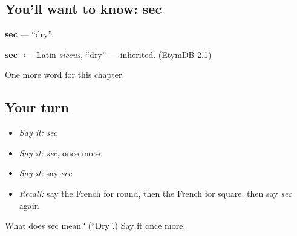 \subsection*{You'll want to know: sec}
\textbf{sec} — \textquotedblleft{}dry\textquotedblright{}.

\begin{cousinweb}
\textbf{sec} $\leftarrow$ Latin \emph{siccus}, \textquotedblleft{}dry\textquotedblright{} — inherited. (EtymDB 2.1)
\end{cousinweb}

\begin{grammarlens}[title={What you've built}]
One more word for this chapter.
\end{grammarlens}

\subsection*{Your turn}
\begin{itemize}
\raggedright
  \item \emph{Say it:} \emph{sec}
  \item \emph{Say it:} \emph{sec}, once more
  \item \emph{Say it:} say \emph{sec}
  \item \emph{Recall:} say the French for round, then the French for square, then say \emph{sec} again
\end{itemize}

\begin{tcolorbox}[breakable,colback=teal!4,colframe=teal!35!black,title={Before you move on}]
What does sec mean? (\textquotedblleft{}Dry\textquotedblright{}.) Say it once more.
\end{tcolorbox}
